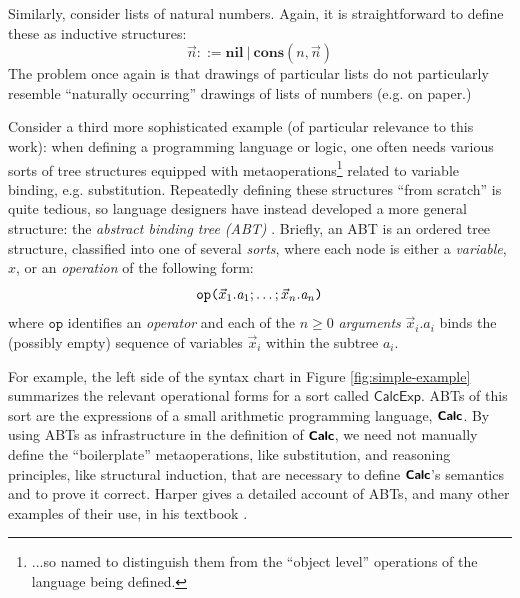 Similarly, consider lists of natural numbers. Again, it is straightforward to define these as inductive structures:
\[ \vec{n} ::= \textbf{nil} ~\vert~ \textbf{cons}(n, \vec{n}) \]
The problem once again is that drawings of particular lists do not particularly resemble ``naturally occurring'' drawings of lists of numbers (e.g. on paper.)

Consider a third more sophisticated example (of particular relevance to this work): when defining a programming language or logic, one often needs various sorts of tree structures equipped with metaoperations\footnote{...so named to distinguish them from the ``object level'' operations of the language being defined.} related to variable binding, e.g. substitution. Repeatedly defining these structures ``from scratch'' is quite tedious, so language designers have instead developed  a more general structure: the \emph{abstract binding tree (ABT)} \cite{Aczel78,pfpl}. Briefly, an ABT is an ordered tree structure, classified into one of several \emph{sorts}, where each node is either a \emph{variable}, $x$, or an \emph{operation} of the following form:
\begin{equation*}
\texttt{op}\texttt{(}\vec{x}_1.\mathit{a}_1; \ldots; \vec{x}_n.\mathit{a}_n\texttt{)}
\end{equation*} 
where $\texttt{op}$ identifies an \emph{operator} and each of the $n \geq 0$ \emph{arguments} $\vec{x}_i.\mathit{a}_i$ binds the (possibly empty) sequence of variables $\vec{x}_i$ within the subtree $a_i$. 

For example, the left side of the syntax chart in Figure \ref{fig:simple-example} summarizes the relevant operational forms for a sort called $\mathsf{CalcExp}$. ABTs of this sort are the expressions of a small arithmetic programming language,  $\textsf{\textbf{\small Calc}}$. By using  ABTs as infrastructure in the definition of $\textsf{\textbf{\small Calc}}$, we need not manually define the ``boilerplate'' metaoperations, like substitution, and reasoning principles, like structural induction, that are necessary to define $\textsf{\textbf{\small Calc}}$'s semantics and to prove it correct. {Harper gives a detailed account of ABTs, and many other examples of their use, in his textbook \cite{pfpl}.} 


